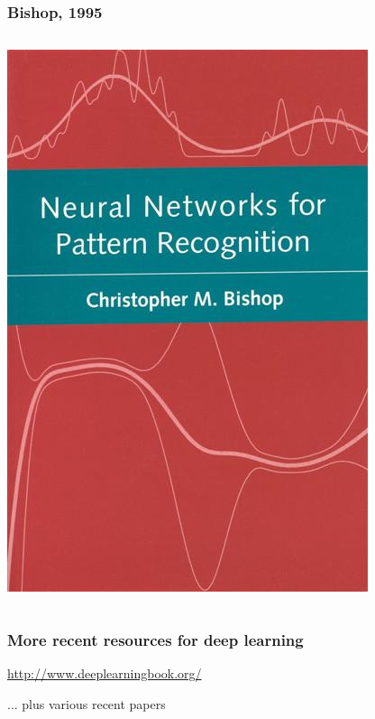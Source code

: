 \begin{frame}
  \frametitle{Bishop, 1995}%
  \begin{columns}%
    \includegraphics[width=\textwidth]{graphics/book_bishop.jpg}%
  \end{columns}%
\end{frame}

\begin{frame}
  \frametitle{More recent resources for deep learning}%
  \begin{center}
  \end{center}
  \vspace*{1em}
  \begin{center}
    \url{http://www.deeplearningbook.org/}
  \end{center}
  \vfill
  ... plus various recent papers
\end{frame}

